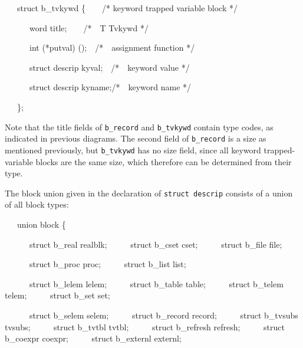 {\ttfamily\mdseries
\ \ \ struct b\_tvkywd \{\ \ \ \ /* keyword trapped variable block */}

{\ttfamily\mdseries
\ \ \ \ \ \ word title;\ \ \ \ /*\ \ T Tvkywd */}

{\ttfamily\mdseries
\ \ \ \ \ \ int (*putval) ();\ \ /*\ \ assignment function */}

{\ttfamily\mdseries
\ \ \ \ \ \ struct descrip kyval;\ \ /*\ \ keyword value */}

{\ttfamily\mdseries
\ \ \ \ \ \ struct descrip kyname;/*\ \ keyword name */}

{\ttfamily\mdseries
\ \ \ \};}

Note that the title fields of \texttt{b\_record} and
\texttt{b\_tvkywd} contain type codes, as indicated in previous
diagrams. The second field of \texttt{b\_record} is a size as
mentioned previously, but \texttt{b\_tvkywd} has no size field, since
all keyword trapped-variable blocks are the same size, which therefore
can be determined from their type.

The block union given in the declaration of \texttt{struct descrip}
consists of a union of all block types:

{\ttfamily\mdseries
\ \ \ union block \{}

{\ttfamily\mdseries
\ \ \ \ \ \ struct b\_real realblk;\newline
 \ \ \ \ \ struct b\_cset cset;\newline
 \ \ \ \ \ struct b\_file file;}

{\ttfamily\mdseries
\ \ \ \ \ \ struct b\_proc proc;\newline
 \ \ \ \ \ struct b\_list list;}

{\ttfamily\mdseries
\ \ \ \ \ \ struct b\_lelem lelem;\newline
 \ \ \ \ \ struct b\_table table;\newline
 \ \ \ \ \ struct b\_telem telem;\newline
 \ \ \ \ \ struct b\_set set;}


\ \ \ \ \ \ struct b\_selem selem;\newline
 \ \ \ \ \ struct b\_record record;\newline
 \ \ \ \ \ struct b\_tvsubs tvsubs;\newline
 \ \ \ \ \ struct b\_tvtbl tvtbl;\newline
 \ \ \ \ \ struct b\_refresh refresh;\newline
 \ \ \ \ \ struct b\_coexpr coexpr;\newline
 \ \ \ \ \ struct b\_externl externl;


